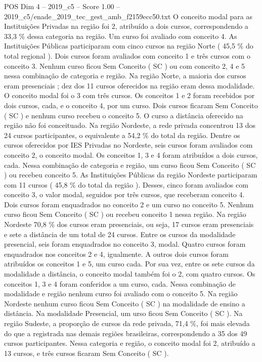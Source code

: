 \begin{textsample}{POS Dim 4 – 2019\_c5 – Score 1.00 – 2019\_c5/enade\_2019\_tec\_gest\_amb\_f2159ecc50.txt}
O conceito modal para as Instituições Privadas na região foi 2, atribuído a dois cursos, correspondendo a 33,3 \% dessa categoria na região.
Um curso foi avaliado com conceito 4.
As Instituições Públicas participaram com cinco cursos na região Norte ( 45,5 \% do total regional ).
Dois cursos foram avaliados com conceito 1 e três cursos com o conceito 3.
Nenhum curso ficou Sem Conceito ( SC ) ou com conceito 2, 4 e 5 nessa combinação de categoria e região.
Na região Norte, a maioria dos cursos eram presenciais ; dez dos 11 cursos oferecidos na região eram dessa modalidade.
O conceito modal foi o 3 com três cursos.
Os conceitos 1 e 2 foram recebidos por dois cursos, cada, e o conceito 4, por um curso.
Dois cursos ficaram Sem Conceito ( SC ) e nenhum curso recebeu o conceito 5.
O curso a distância oferecido na região não foi conceituado.
Na região Nordeste, a rede privada concentrou 13 dos 24 cursos participantes, o equivalente a 54,2 \% do total da região.
Dentre os cursos oferecidos por IES Privadas no Nordeste, seis cursos foram avaliados com conceito 2, o conceito modal.
Os conceitos 1, 3 e 4 foram atribuídos a dois cursos, cada.
Nessa combinação de categoria e região, um curso ficou Sem Conceito ( SC ) ou recebeu conceito 5.
As Instituições Públicas da região Nordeste participaram com 11 cursos ( 45,8 \% do total da região ).
Desses, cinco foram avaliados com conceito 3, o valor modal, seguidos por três cursos, que receberam conceito 4.
Dois cursos foram enquadrados no conceito 2 e um curso no conceito 5.
Nenhum curso ficou Sem Conceito ( SC ) ou recebeu conceito 1 nessa região.
Na região Nordeste 70,8 \% dos cursos eram presenciais, ou seja, 17 cursos eram presenciais e sete a distância de um total de 24 cursos.
Entre os cursos da modalidade presencial, seis foram enquadrados no conceito 3, modal.
Quatro cursos foram enquadrados nos conceitos 2 e 4, igualmente.
A outros dois cursos foram atribuídos os conceitos 1 e 5, um curso cada.
Por sua vez, entre os sete cursos da modalidade a distância, o conceito modal também foi o 2, com quatro cursos.
Os conceitos 1, 3 e 4 foram conferidos a um curso, cada.
Nessa combinação de modalidade e região nenhum curso foi avaliado com o conceito 5.
Na região Nordeste nenhum curso ficou Sem Conceito ( SC ) na modalidade de ensino a distância.
Na modalidade Presencial, um urso ficou Sem Conceito ( SC ).
Na região Sudeste, a proporção de cursos da rede privada, 71,4 \%, foi mais elevada do que a registrada nas demais regiões brasileiras, correspondendo a 35 dos 49 cursos participantes.
Nessa categoria e região, o conceito modal foi 2, atribuído a 13 cursos, e três cursos ficaram Sem Conceito ( SC ).

\end{textsample}
